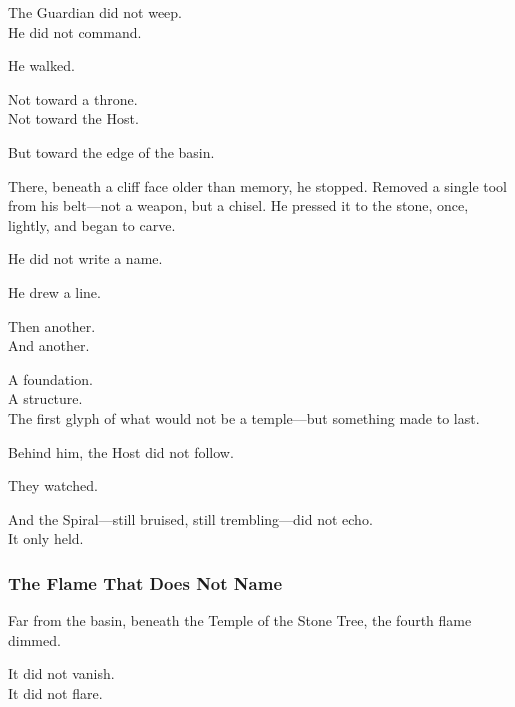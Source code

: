 \documentclass[12pt]{article}
\begin{document}
\vspace{0.5em}
The Guardian did not weep.\\
He did not command.

\vspace{0.5em}
He walked.

\vspace{0.5em}
Not toward a throne.\\
Not toward the Host.

\vspace{0.5em}
But toward the edge of the basin.

\vspace{0.5em}
There, beneath a cliff face older than memory, he stopped. Removed a single tool from his belt---not a weapon, but a chisel. He pressed it to the stone, once, lightly, and began to carve.

\vspace{0.5em}
He did not write a name.

\vspace{0.5em}
He drew a line.

\vspace{0.5em}
Then another.\\
And another.

\vspace{0.5em}
A foundation.\\
A structure.\\
The first glyph of what would not be a temple---but something made to last.

\vspace{0.5em}
Behind him, the Host did not follow.

\vspace{0.5em}
They watched.

\vspace{0.5em}
And the Spiral---still bruised, still trembling---did not echo.\\
It only held.


\dotfill

\subsubsection*{The Flame That Does Not Name}

Far from the basin, beneath the Temple of the Stone Tree, the fourth flame dimmed.

\vspace{0.5em}
It did not vanish.\\
It did not flare.
\end{document}
